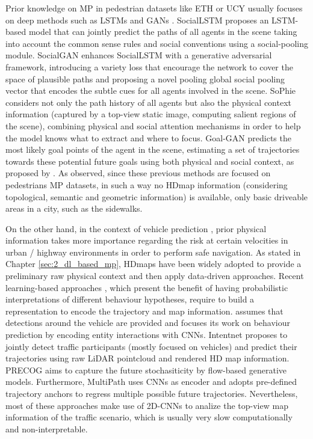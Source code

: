 Prior knowledge on \ac{MP} in pedestrian datasets like ETH \cite{pellegrini2009you} or UCY \cite{lerner2007ucydata} usually focuses on deep methods such as \acp{LSTM} \cite{hochreiter1997long} and \acp{GAN} \cite{goodfellow2020generative}. SocialLSTM \cite{alahi2016social} proposes an \ac{LSTM}-based model that can jointly predict the paths of all agents in the scene taking into account the common sense rules and social conventions using a social-pooling module. SocialGAN \cite{gupta2018social} enhances SocialLSTM with a generative adversarial framework, introducing a variety loss that encourage the network to cover the space of plausible paths and proposing a novel pooling global social pooling vector that encodes the subtle cues for all agents involved in the scene. SoPhie \cite{sadeghian2019sophie} considers not only the path history of all agents but also the physical context information (captured by a top-view static image, computing salient regions of the scene), combining physical and social attention mechanisms in order to help the model knows what to extract and where to focus. Goal-GAN \cite{dendorfer2020goal} predicts the most likely goal points of the agent in the scene, estimating a set of trajectories towards these potential future goals using both physical and social context, as proposed by \cite{sadeghian2019sophie}. As observed, since these previous methods are focused on pedestrians \ac{MP} datasets, in such a way no \ac{HDmap} information (considering topological, semantic and geometric information) is available, only basic driveable areas in a city, such as the sidewalks.

On the other hand, in the context of vehicle prediction \cite{chang2019argoverse, caesar2020nuscenes}, prior physical information takes more importance regarding the risk at certain velocities in urban / highway environments in order to perform safe navigation. As stated in Chapter \ref{sec:2_dl_based_mp}, \acp{HDmap} have been widely adopted to provide a preliminary raw physical context and then apply data-driven approaches. Recent learning-based approaches \cite{hong2019rules, casas2018intentnet}, which present the benefit of having probabilistic interpretations of different behaviour hypotheses, require to build a representation to encode the trajectory and map information. \cite{hong2019rules} assumes that detections around the vehicle are provided and focuses its work on behaviour prediction by encoding entity interactions with \acp{CNN}. Intentnet \cite{casas2018intentnet} proposes to jointly detect traffic participants (mostly focused on vehicles) and predict their trajectories using raw LiDAR pointcloud and rendered HD map information. PRECOG \cite{rhinehart2019precog} aims to capture the future stochasiticity by flow-based generative models. Furthermore, MultiPath \cite{chai2019multipath} uses \acp{CNN} as encoder and adopts pre-defined trajectory anchors to regress multiple possible future trajectories. Nevertheless, most of these approaches make use of 2D-\acp{CNN} to analize the top-view map information of the traffic scenario, which is usually very slow computationally and non-interpretable.

